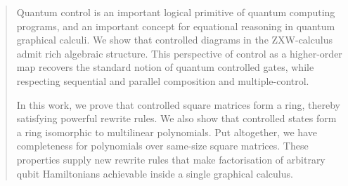 \begin{abstract}
    Quantum control is an important logical primitive of quantum computing programs, and an important concept for equational reasoning in quantum graphical calculi.
    We show that controlled diagrams in the ZXW-calculus admit rich algebraic structure. This perspective of control as a higher-order map recovers the standard notion of quantum controlled gates, while respecting sequential and parallel composition and multiple-control.

    In this work, we prove that controlled square matrices form a ring, thereby satisfying powerful rewrite rules. We also show that controlled states form a ring isomorphic to multilinear polynomials. Put altogether, we have completeness for polynomials over same-size square matrices.
    These properties supply new rewrite rules that make factorisation of arbitrary qubit Hamiltonians achievable inside a single graphical calculus.
\end{abstract}